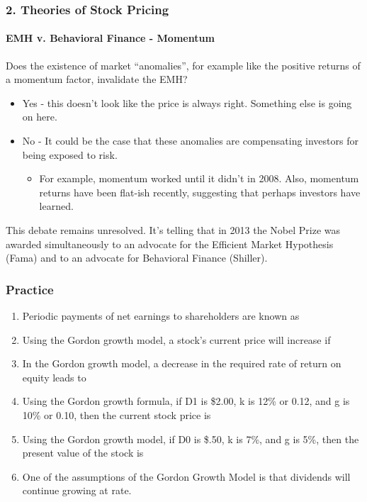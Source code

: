 \documentclass{beamer}
\begin{document}
\begin{frame}[t]
    \frametitle{2. Theories of Stock Pricing}
    \framesubtitle{EMH v. Behavioral Finance - Momentum}

    Does the existence of market “anomalies”, for example like the positive returns of a momentum factor, invalidate the EMH?
    \begin{itemize}
        \item Yes - this doesn't look like the price is always right.   Something else is going on here.
        \item No - It could be the case that these anomalies are compensating investors for being exposed to risk.
        \begin{itemize}
            \item For example, momentum worked until it didn’t in 2008.   Also, momentum returns have been flat-ish recently, suggesting that perhaps investors have learned.
        \end{itemize}
    \end{itemize}
    \vspace{1em}
    This debate remains unresolved.   It's telling that in 2013 the Nobel Prize was awarded simultaneously to an advocate for the Efficient Market Hypothesis (Fama) and to an advocate for Behavioral Finance (Shiller).

\end{frame}

\begin{practiceframe}
    \frametitle{Practice}

\begin{enumerate}
    \item Periodic payments of net earnings to shareholders are known as \underline{\hspace{3cm}}
    \item Using the Gordon growth model, a stock's current price will increase if \underline{\hspace{3cm}}
    \item In the Gordon growth model, a decrease in the required rate of return on equity leads to \underline{\hspace{3cm}}
    \item Using the Gordon growth formula, if D1 is \$2.00, k is 12\% or 0.12, and g is 10\% or 0.10, then the current stock price is \underline{\hspace{3cm}}
    \item Using the Gordon growth model, if D0 is \$.50, k is 7\%, and g is 5\%, then the present value of the stock is \underline{\hspace{3cm}}
    \item One of the assumptions of the Gordon Growth Model is that dividends will continue growing at \underline{\hspace{3cm}} rate.
\end{enumerate}

\end{practiceframe}
\end{document}
